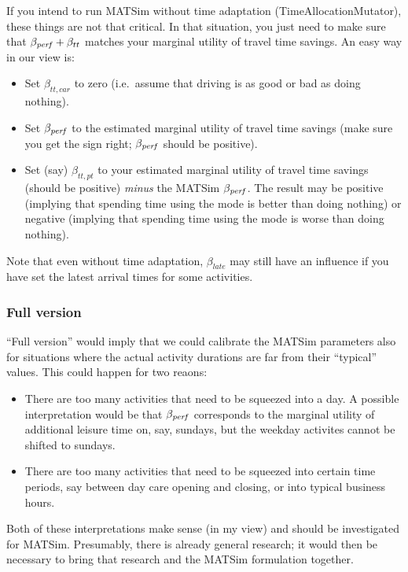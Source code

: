 If you intend to run MATSim without time adaptation  (TimeAllocationMutator), these things are not that critical. In  that situation, you just need to make sure that $\beta_{\it perf} + \beta_{tt}$  matches your marginal utility of travel time savings. An easy  way in our view is:
\begin{itemize}

\item Set $\beta_{tt,car}$ to zero (i.e.\ assume that driving
	is as good or bad as doing nothing).  

\item Set $\beta_{\it perf}$ to
	the estimated marginal utility of travel time savings (make
	sure you get the sign right; $\beta_{\it perf}$ should be
	positive).  \item Set (say) $\beta_{tt,pt}$ to your estimated
	marginal utility of travel time savings (should be
	positive) \emph{minus} the MATSim $\beta_{\it perf}$. The result may
	be positive (implying that spending time using the mode is
	better than doing nothing) or negative (implying that spending
	time using the mode is worse than doing nothing).
\end{itemize}
Note that even without time adaptation, $\beta_{late}$ may still have an influence if you have set the latest arrival times for some  activities.

\subsubsection{Full version}

``Full version'' would imply that we could calibrate the MATSim  parameters also for situations where the actual activity durations are  far from their ``typical'' values. This could happen for two reaons:
\begin{itemize}

\item There are too many activities that need to be squeezed into a  day. A possible interpretation would be that $\beta_{\it perf}$ corresponds  to the marginal utility of additional leisure time on, say, sundays,  but the weekday activites cannot be shifted to sundays.

\item There are too many activities that need to be squeezed
into certain time periods, say between day care opening and closing,
or into typical business hours.

\end{itemize}
Both of these interpretations make sense (in my view) and should be
investigated for MATSim. Presumably, there is already general
research; it would then be necessary to bring that research and the
MATSim formulation together.


